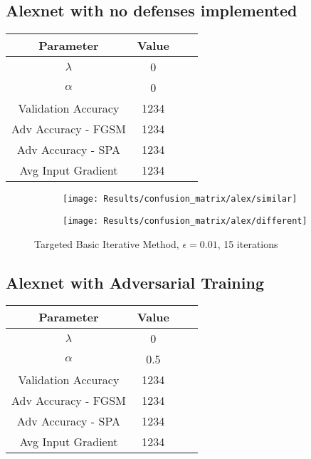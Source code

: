 \documentclass[draft,final]{vutinfth} %
\begin{document}
\subsection{Alexnet with no defenses implemented}

\begin{table}[h]
  \centering
  \begin{tabular}{cccc}
    \toprule
			Parameter			& Value   \\
    \midrule
			$\lambda$								& 0				\\
			$\alpha$								& 0				\\
			
			Validation Accuracy			& 1234		\\ %
			Adv Accuracy - FGSM			& 1234 		\\
			Adv Accuracy - SPA			& 1234		\\
			
			Avg Input Gradient			& 1234		\\
    \bottomrule
  \end{tabular}
\end{table}


\begin{figure}[h]
  \begin{subfigure}[b]{0.5\columnwidth}
		\centering
    \texttt{[image: Results/confusion\_matrix/alex/similar]}%
    \label{fig:exp:cm:alex:similar}
  \end{subfigure}
  \begin{subfigure}[b]{0.5\columnwidth}
		\centering
    \texttt{[image: Results/confusion\_matrix/alex/different]}
    \label{fig:exp:cm:alex:different}
  \end{subfigure}
  \caption{Targeted Basic Iterative Method, $\epsilon = 0.01$, 15 iterations}
  \label{fig:intro} %
\end{figure}

\subsection{Alexnet with Adversarial Training}

\begin{table}[h]
  \centering
  \begin{tabular}{cccc}
    \toprule
			Parameter			& Value   \\
    \midrule
			$\lambda$								& 0				\\
			$\alpha$								& 0.5			\\
			
			Validation Accuracy			& 1234		\\ %
			Adv Accuracy - FGSM			& 1234 		\\
			Adv Accuracy - SPA			& 1234		\\
			
			Avg Input Gradient			& 1234		\\
    \bottomrule
  \end{tabular}
\end{table}
\end{document}
